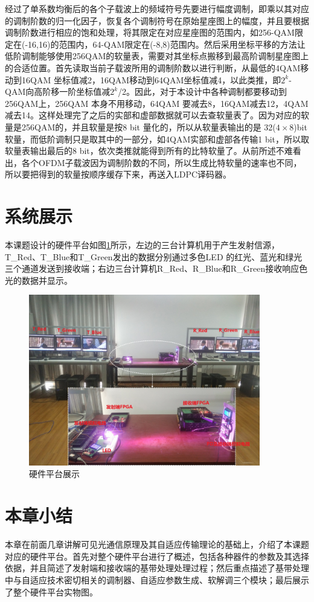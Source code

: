 经过了单系数均衡后的各个子载波上的频域符号先要进行幅度调制，即乘以其对应的调制阶数的归一化因子，恢复各个调制符号在原始星座图上的幅度，并且要根据调制阶数进行相应的饱和处理，将其限定在对应星座图的范围内，如256-QAM限定在(-16,16)的范围内，64-QAM限定在(-8,8)范围内。然后采用坐标平移的方法让低阶调制能够使用256QAM的软量表，需要对其坐标点搬移到最高阶调制星座图上的合适位置。首先读取当前子载波所用的调制阶数以进行判断，从最低的4QAM移动到16QAM 坐标值减2，16QAM移动到64QAM坐标值减4，以此类推，即$2^k$-QAM向高阶移一阶坐标值减$2^k$/2。因此，对于本设计中各种调制都要移动到256QAM上，256QAM 本身不用移动，64QAM 要减去8，16QAM减去12，4QAM减去14。这样处理完了之后的实部和虚部数据就可以去查软量表了。因为对应的软量是256QAM的，并且软量是按8 bit 量化的，所以从软量表输出的是 32($4\times 8$)bit软量，而低阶调制只是取其中的一部分，如4QAM实部和虚部各传输1 bit，所以取软量表输出最后的8 bit，依次类推就能得到所有的比特软量了。从前所述不难看出，各个OFDM子载波因为调制阶数的不同，所以生成比特软量的速率也不同，所以要把得到的软量按顺序缓存下来，再送入LDPC译码器。

\section{系统展示}
本课题设计的硬件平台如图\ref{fig:Demo}所示，左边的三台计算机用于产生发射信源，T\_Red、T\_Blue和T\_Green发出的数据分别通过多色LED 的红光、蓝光和绿光三个通道发送到接收端；右边三台计算机R\_Red、R\_Blue和R\_Green接收响应色光的数据并显示。

\begin{figure}[htbp]
\centering
\includegraphics[width=0.9\textwidth]{figures/chapter-5/Demo.jpg}
\caption{硬件平台展示}
\label{fig:Demo}
\end{figure}




\section{本章小结}
本章在前面几章讲解可见光通信原理及其自适应传输理论的基础上，介绍了本课题对应的硬件平台。首先对整个硬件平台进行了概述，包括各种器件的参数及其选择依据，并且简述了发射端和接收端的基带处理处理过程；然后重点描述了基带处理中与自适应技术密切相关的调制器、自适应参数生成、软解调三个模块；最后展示了整个硬件平台实物图。
